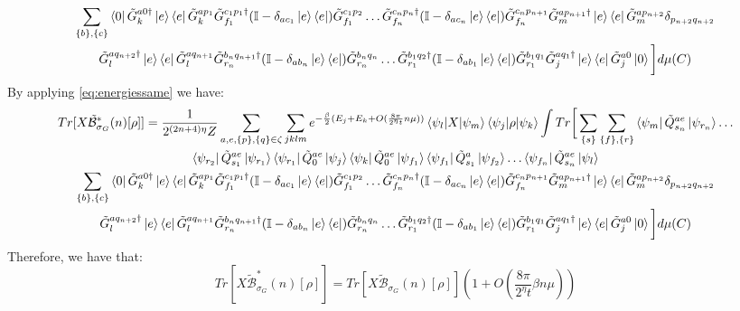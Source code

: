 \documentclass[aps,floatfix,10pt,amssymb,amsfont,amsmath,superscriptaddress,float,nofootinbib,longbibliography,nobalancelastpage,twocolumn]{revtex4-2}
\begin{document}
\begin{widetext}
\begin{multline}
\sum_{\{b\}, \{c\}}
\bra{0}\tilde G^{a0\dagger}_k\ket{e}\bra{e}\tilde G^{ap_1}_k\tilde G^{c_1p_1\dagger}_{f_1}(\mathbb{I} - \delta_{ac_1}\ket{e}\bra{e})\tilde G^{c_1p_2}_{f_1}\ldots \tilde G^{c_np_n\dagger}_{f_n}(\mathbb{I} - \delta_{ac_n}\ket{e}\bra{e})\tilde G^{c_np_{n+1}}_{f_n}\tilde G^{ap_{n+1}\dagger}_{m}\ket{e}\bra{e}\tilde G^{ap_{n+2}}_m \delta_{p_{n+2}q_{n+2}}\\\tilde G^{aq_{n+2}\dagger}_l \ket{e}\bra{e}\tilde G^{aq_{n+1}}_l \tilde G^{b_{n}q_{n+1}\dagger}_{r_n}(\mathbb{I} - \delta_{ab_n}\ket{e}\bra{e})\tilde G^{b_nq_n}_{r_n}\ldots \tilde G^{b_1q_2\dagger}_{r_1}(\mathbb{I} - \delta_{ab_1}\ket{e}\bra{e})\tilde G^{b_1q_1}_{r_1}\tilde G^{aq_1\dagger}_j\ket{e}\bra{e}\tilde G^{a0}_j\ket{0}\bigg]d\mu(C) 
\end{multline}
By applying \eqref{eq:energiessame} we have:
\begin{multline}
    Tr[X\tilde{\mathcal{B}}^*_{\sigma_G}(n)[\rho]] = \frac{1}{2^{(2n+4)\eta}Z}\sum_{a,e, \{p\}, \{q\}\in \zeta}
    \sum_{jklm}e^{-\frac{\beta}{2}(E_j+E_k + O(\frac{8\pi}{2^{\eta}t}n\mu))}\braket{\psi_l|X|\psi_m}\braket{\psi_j|\rho|\psi_k}\int Tr\bigg[ \sum_{\{s\}}\sum_{\{f\}, \{r\}}\bra{\psi_m}\tilde Q^{ae}_{s_n}\ket{\psi_{r_{n}}}\ldots \\\bra{\psi_{r_2}}\tilde Q^{ae}_{s_1}\ket{\psi_{r_1}}\bra{\psi_{r_1}}\tilde Q^{ae}_0\ket{\psi_j}
\bra{\psi_k}\tilde Q^{ae}_0\ket{\psi_{f_1}}\bra{\psi_{f_1}}\tilde Q^a_{s_1}\ket{\psi_{f_2}}\ldots \bra{\psi_{f_{n}}}\tilde Q^{ae}_{s_n}\ket{\psi_l}\\
\sum_{\{b\}, \{c\}}
\bra{0}\tilde G^{a0\dagger}_k\ket{e}\bra{e}\tilde G^{ap_1}_k\tilde G^{c_1p_1\dagger}_{f_1}(\mathbb{I} - \delta_{ac_1}\ket{e}\bra{e})\tilde G^{c_1p_2}_{f_1}\ldots \tilde G^{c_np_n\dagger}_{f_n}(\mathbb{I} - \delta_{ac_n}\ket{e}\bra{e})\tilde G^{c_np_{n+1}}_{f_n}\tilde G^{ap_{n+1}\dagger}_{m}\ket{e}\bra{e}\tilde G^{ap_{n+2}}_m \delta_{p_{n+2}q_{n+2}}\\\tilde G^{aq_{n+2}\dagger}_l \ket{e}\bra{e}\tilde G^{aq_{n+1}}_l \tilde G^{b_{n}q_{n+1}\dagger}_{r_n}(\mathbb{I} - \delta_{ab_n}\ket{e}\bra{e})\tilde G^{b_nq_n}_{r_n}\ldots \tilde G^{b_1q_2\dagger}_{r_1}(\mathbb{I} - \delta_{ab_1}\ket{e}\bra{e})\tilde G^{b_1q_1}_{r_1}\tilde G^{aq_1\dagger}_j\ket{e}\bra{e}\tilde G^{a0}_j\ket{0}\bigg]d\mu(C)
\end{multline}
Therefore, we have that:
\begin{equation}
    Tr[X\tilde{\mathcal{B}}^*_{\sigma_G}(n)[\rho]] =Tr[X\tilde{\mathcal{B}}_{\sigma_G}(n)[\rho]](1+O(\frac{8\pi}{2^{\eta}t}\beta n\mu))

\end{equation}
\end{widetext}
\end{document}
